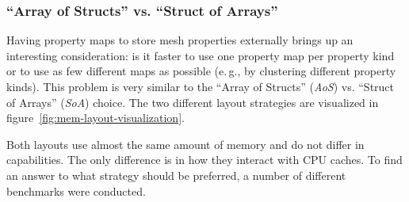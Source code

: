 \newpage
\subsubsection*{\enquote{Array of Structs} vs. \enquote{Struct of Arrays}}

Having property maps to store mesh properties externally brings up an interesting consideration: is it faster to use one property map per property kind or to use as few different maps as possible (e.\,g., by clustering different property kinds).
This problem is very similar to the \enquote{Array of Structs} (\emph{AoS}) vs. \enquote{Struct of Arrays} (\emph{SoA}) choice.
The two different layout strategies are visualized in figure~\ref{fig:mem-layout-visualization}.

Both layouts use almost the same amount of memory and do not differ in capabilities.
The only difference is in how they interact with CPU caches.
To find an answer to what strategy should be preferred, a number of different benchmarks were conducted.

